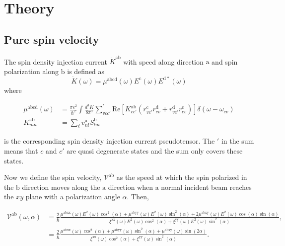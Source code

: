 \documentclass[prb,11pt,tightenlines,twocolumn,aps]{revtex4-1}
\begin{document}
\section{Theory} %
\label{sec:theory}




\subsection{Pure spin velocity} %
\label{sec:theory-pure_spin_current}

The spin density injection current $\dot{K}^{\mathrm{ab}}$ with speed along
direction $\mathrm{a}$ and spin polarization along $\mathrm{b}$ is defined as
\begin{equation}
\dot{K}(\omega) = \mu^{\mathrm{abcd}}(\omega)
E^{\mathrm{c}}(\omega) E^{\mathrm{d*}}(\omega)
\label{eq:dotk}
\end{equation}
where
\begin{widetext}
\begin{align}
\mu^{\mathrm{abcd}} (\omega) 
&=
\frac{\pi e^{2}}{\hbar^{2}} \int 
\frac{d^{3}K}{8 \pi^{3}} \sum_{vcc'}^{'}
\mathrm{Re} \left[ K^{\mathrm{ab}}_{cc'} ( 
r^{\mathrm{c}}_{vc'} 
r^{\mathrm{d}}_{cv } +
r^{\mathrm{d}}_{vc'} 
r^{\mathrm{c}}_{cv } ) \right]
\delta(\omega-\omega_{cv})
\label{eq:mu}
\\
K^{\mathrm{ab}}_{mn}
&=
\sum_{\ell}v^{\mathrm{a}}_{nl} S^{\mathrm{b}}_{lm}
\label{eq:velspi-matelem}
\end{align}
\end{widetext}
is the corresponding spin density injection current pseudotensor. The $'$
in the sum means that $c$ and $c'$ are quasi degenerate states and the sum only
covers these states.

Now we define the spin velocity, $\mathcal{V}^{\mathrm{ab}}$ as the speed at
which the spin polarized in the $\mathrm{b}$   direction moves along the
$\mathrm{a}$ direction when a normal incident beam reaches the $xy$ plane with a
polarization angle $\alpha$. Then,
\begin{widetext}
\begin{align}
\mathcal{V}^{\mathrm{ab}}(\omega,\alpha)
&= \frac{2}{\hbar}
\frac{\mu^{\mathrm{abxx}}(\omega)
E^{2}(\omega)\cos^{2}(\alpha) + 
\mu^{\mathrm{abyy}}(\omega)
E^{2}(\omega)\sin^{2}(\alpha) + 
2\mu^{\mathrm{abxy}}(\omega)
E^{2}(\omega)\cos(\alpha)\sin(\alpha)}
{\xi^{\mathrm{xx}}(\omega)
E^{2}(\omega)\cos^{2}(\alpha) + 
\xi^{\mathrm{yy}}(\omega)
E^{2}(\omega)\sin^{2}(\alpha)},
\nonumber \\
&= \frac{2}{\hbar}
\frac{\mu^{\mathrm{abxx}}(\omega)\cos^{2}(\alpha) + 
\mu^{\mathrm{abyy}}(\omega)\sin^{2}(\alpha) + 
\mu^{\mathrm{abxy}}(\omega)\sin(2\alpha)}
{\xi^{\mathrm{xx}}(\omega)\cos^{2}(\alpha) + 
\xi^{\mathrm{yy}}(\omega)\sin^{2}(\alpha)}.
\label{eq:vab}
\end{align}
\end{widetext}
\end{document}
